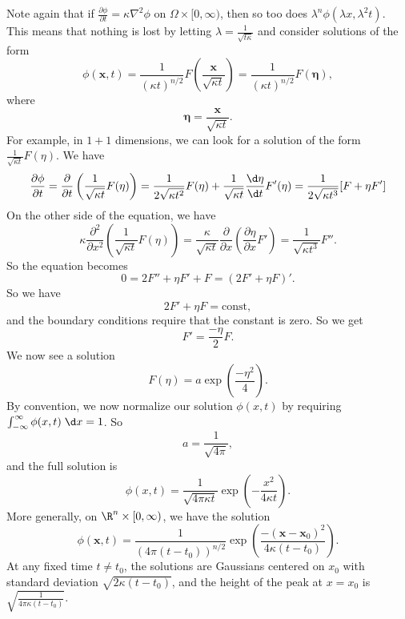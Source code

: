 \documentclass[a4paper]{article}
\begin{document}
Note again that if $\frac{\partial\phi}{\partial t} = \kappa \nabla^2 \phi$ on $\Omega\times [0, \infty)$, then so too does $\lambda^n \phi(\lambda x, \lambda^2 t)$. This means that nothing is lost by letting $\lambda = \frac{1}{\sqrt{t \kappa}}$ and consider solutions of the form %
\[
  \phi(\mathbf{x}, t) = \frac{1}{(\kappa t)^{n/2}} F\left(\frac{\mathbf{x}}{\sqrt{\kappa t}}\right) = \frac{1}{(\kappa t)^{n/2}}F(\boldsymbol\eta),
\]
where
\[
  \boldsymbol\eta = \frac{\mathbf{x}}{\sqrt{\kappa t}}.
\]
For example, in $1 + 1$ dimensions, we can look for a solution of the form $\frac{1}{\sqrt{\kappa t}} F(\eta)$. We have
\[
  \frac{\partial\phi}{\partial t} = \frac{\partial}{\partial t}\left(\frac{1}{\sqrt{\kappa t}} F(\eta)\right) = \frac{1}{2\sqrt{\kappa t^2}} F(\eta) + \frac{1}{\sqrt{\kappa t}} \frac{\d \eta}{\d t}F'(\eta) = \frac{1}{2\sqrt{\kappa t^3}}[F + \eta F']
\]
On the other side of the equation, we have
\[
  \kappa\frac{\partial^2}{\partial x^2} \left(\frac{1}{\sqrt{\kappa t}} F(\eta)\right) = \frac{\kappa}{\sqrt{\kappa t}} \frac{\partial}{\partial x}\left(\frac{\partial \eta}{\partial x} F'\right) = \frac{1}{\sqrt{\kappa t^3}}F''.
\]
So the equation becomes
\[
  0 = 2F'' + \eta F' + F = (2F' + \eta F)'.
\]
So we have
\[
  2F' + \eta F = \text{const},
\]
and the boundary conditions require that the constant is zero. So we get
\[
  F' = \frac{-\eta}{2}F.
\]
We now see a solution
\[
  F(\eta) = a \exp\left(\frac{-\eta^2}{4}\right).
\]
By convention, we now normalize our solution $\phi(x, t)$ by requiring $\int_{-\infty}^\infty \phi(x, t)\;\d x = 1$. So
\[
  a = \frac{1}{\sqrt{4\pi}},
\]
and the full solution is
\[
  \phi(x, t) = \frac{1}{\sqrt{4\pi \kappa t}}\exp\left(- \frac{x^2}{4\kappa t}\right).
\]
More generally, on $\R^n \times [0, \infty)$, we have the solution
\[
  \phi(\mathbf{x}, t) = \frac{1}{(4\pi (t - t_0))^{n/2}} \exp\left(\frac{-(\mathbf{x} - \mathbf{x}_0)^2}{4\kappa(t - t_0)}\right).
\]
At any fixed time $t\not= t_0$, the solutions are Gaussians centered on $x_0$ with standard deviation $\sqrt{2\kappa (t - t_0)}$, and the height of the peak at $x = x_0$ is $\sqrt{\frac{1}{4\pi \kappa (t - t_0)}}$.
\end{document}
